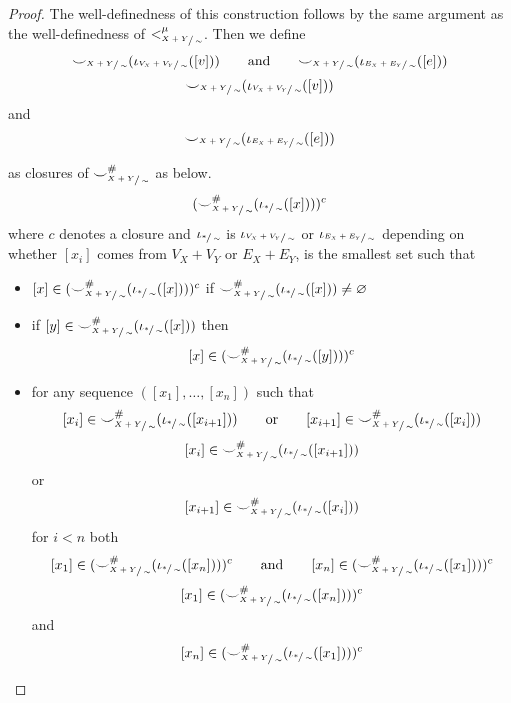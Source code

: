 \begin{proof}
    The well-definedness of this construction follows by the same argument as the well-definedness of $<_{\sfrac{X+Y}{\sim}}^{\mu}$.
    Then we define
    \ifdefined \ONECOLUMN
    \[
        {\smile}_{\sfrac{X+Y}{\sim}}(\iota_{\sfrac{V_{X} + V_{Y}}{\sim}}([v])) \qquad \text{and} \qquad {\smile}_{\sfrac{X+Y}{\sim}}(\iota_{\sfrac{E_{X} + E_{Y}}{\sim}}([e]))
    \]
    \else
    \[
        {\smile}_{\sfrac{X+Y}{\sim}}(\iota_{\sfrac{V_{X} + V_{Y}}{\sim}}([v]))
    \]
    and
    \[
        {\smile}_{\sfrac{X+Y}{\sim}}(\iota_{\sfrac{E_{X} + E_{Y}}{\sim}}([e]))
    \]
    \fi

    as closures of ${\smile}^{{\#}}_{\sfrac{X+Y}{\sim}}$ as below.
    \[
      ({\smile}^{{\#}}_{\sfrac{X+Y}{\sim}}(\iota_{\sfrac{*}{\sim}}([x])))^{c}
    \]
    where $c$ denotes a closure and $\iota_{\sfrac{*}{\sim}}$ is $\iota_{\sfrac{V_{X} + V_{Y}}{\sim}}$ or $\iota_{\sfrac{E_{X} + E_{Y}}{\sim}}$ depending on whether $[x_i]$ comes from $V_{X} + V_{Y}$ or $E_{X} + E_{Y}$, is the smallest set such that
    \begin{itemize}
        \item $[x] \in ({\smile}^{{\#}}_{\sfrac{X+Y}{\sim}}(\iota_{\sfrac{*}{\sim}}([x])))^{c}$ if ${\smile}^{{\#}}_{\sfrac{X+Y}{\sim}}(\iota_{\sfrac{*}{\sim}}([x])) \not = \varnothing$
        \item if $[y] \in {\smile}^{{\#}}_{\sfrac{X+Y}{\sim}}(\iota_{\sfrac{*}{\sim}}([x]))$ then 
        \[
            [x] \in ({\smile}^{{\#}}_{\sfrac{X+Y}{\sim}}(\iota_{\sfrac{*}{\sim}}([y])))^{c}
        \]
        \item for any sequence $([x_1], \ldots, [x_n])$ such that
        \ifdefined \ONECOLUMN
        \[[x_i] \in {\smile}^{{\#}}_{\sfrac{X+Y}{\sim}}(\iota_{\sfrac{*}{\sim}}([x_{i+1}])) \qquad \text{or} \qquad [x_{i+1}] \in {\smile}^{{\#}}_{\sfrac{X+Y}{\sim}}(\iota_{\sfrac{*}{\sim}}([x_{i}]))\]
        \else
        \[
            [x_i] \in {\smile}^{{\#}}_{\sfrac{X+Y}{\sim}}(\iota_{\sfrac{*}{\sim}}([x_{i+1}]))
        \] or 
        \[
            [x_{i+1}] \in {\smile}^{{\#}}_{\sfrac{X+Y}{\sim}}(\iota_{\sfrac{*}{\sim}}([x_{i}]))
        \]
        \fi
         for $i < n$ both
        \ifdefined \ONECOLUMN
        \[
            [x_1] \in ({\smile}^{{\#}}_{\sfrac{X+Y}{\sim}}(\iota_{\sfrac{*}{\sim}}([x_{n}])))^{c} \qquad \text{and} \qquad [x_n] \in ({\smile}^{{\#}}_{\sfrac{X+Y}{\sim}}(\iota_{\sfrac{*}{\sim}}([x_{1}])))^{c}
        \]
        \else
         \[
            [x_1] \in ({\smile}^{{\#}}_{\sfrac{X+Y}{\sim}}(\iota_{\sfrac{*}{\sim}}([x_{n}])))^{c}
        \]
        and
        \[
            [x_n] \in ({\smile}^{{\#}}_{\sfrac{X+Y}{\sim}}(\iota_{\sfrac{*}{\sim}}([x_{1}])))^{c}
        \]
        \fi
    \end{itemize}


\end{proof}

